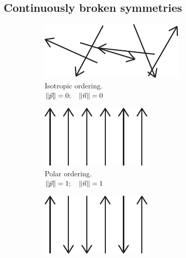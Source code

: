 \subsection{Continuously broken symmetries}\label{subsec:introLocalOrder}

\begin{figure}
\centering
\begin{subfigure}{0.25\textwidth}
    \centering
    \includegraphics[width=\textwidth]{Introduction/FigureLocalOrdering/isotropic.pdf}
    \caption{Isotropic ordering.\\$\norm{\vec{p}} = 0;\quad \norm{\vec{n}} = 0$}
    \label{subfig:introTheoryLocalOrdering-isotropic}
\end{subfigure}
\hfill
\begin{subfigure}{0.25\textwidth}
    \centering
    \includegraphics[width=\textwidth]{Introduction/FigureLocalOrdering/polar.pdf}
    \caption{Polar ordering.\\$\norm{\vec{p}} = 1;\quad \norm{\vec{n}} = 1$}
    \label{subfig:introTheoryLocalOrdering-polar}
\end{subfigure}
\hfill
\begin{subfigure}{0.25\textwidth}
    \centering
    \includegraphics[width=\textwidth]{Introduction/FigureLocalOrdering/nematic.pdf}

\end{subfigure}
\end{figure}
